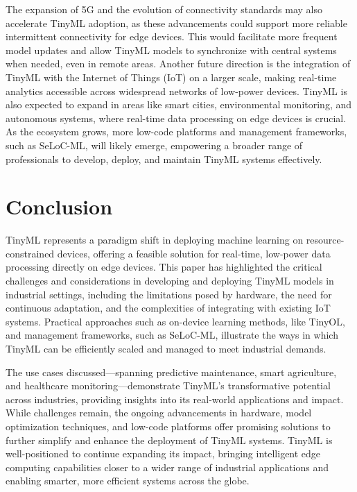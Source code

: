\documentclass[twocolumn]{article}
\begin{document}
The expansion of 5G and the evolution of connectivity standards may also accelerate TinyML adoption, as these advancements could support more reliable intermittent connectivity for edge devices. This would facilitate more frequent model updates and allow TinyML models to synchronize with central systems when needed, even in remote areas. Another future direction is the integration of TinyML with the Internet of Things (IoT) on a larger scale, making real-time analytics accessible across widespread networks of low-power devices. TinyML is also expected to expand in areas like smart cities, environmental monitoring, and autonomous systems, where real-time data processing on edge devices is crucial. As the ecosystem grows, more low-code platforms and management frameworks, such as SeLoC-ML, will likely emerge, empowering a broader range of professionals to develop, deploy, and maintain TinyML systems effectively.



\section{Conclusion}
\label{conclusion}

TinyML represents a paradigm shift in deploying machine learning on resource-constrained devices, offering a feasible solution for real-time, low-power data processing directly on edge devices. This paper has highlighted the critical challenges and considerations in developing and deploying TinyML models in industrial settings, including the limitations posed by hardware, the need for continuous adaptation, and the complexities of integrating with existing IoT systems. Practical approaches such as on-device learning methods, like TinyOL, and management frameworks, such as SeLoC-ML, illustrate the ways in which TinyML can be efficiently scaled and managed to meet industrial demands.

The use cases discussed—spanning predictive maintenance, smart agriculture, and healthcare monitoring—demonstrate TinyML's transformative potential across industries, providing insights into its real-world applications and impact. While challenges remain, the ongoing advancements in hardware, model optimization techniques, and low-code platforms offer promising solutions to further simplify and enhance the deployment of TinyML systems. TinyML is well-positioned to continue expanding its impact, bringing intelligent edge computing capabilities closer to a wider range of industrial applications and enabling smarter, more efficient systems across the globe.





\end{document}
